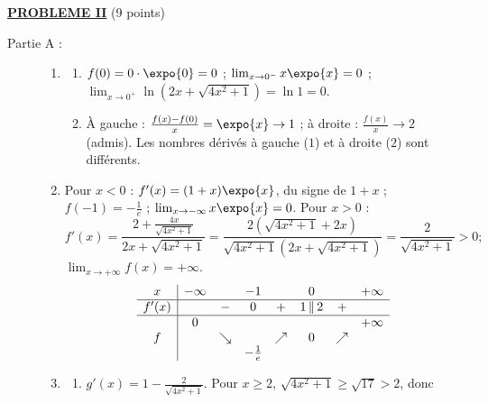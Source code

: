 \noindent \underline{\textsc{\textbf{PROBLEME II}}} (9 points)
\begin{description}
	\item[Partie A :]
	\begin{enumerate}
		\item
		\begin{enumerate}
			\item {}
				$f(0) = 0 \cdot \expo{0} = 0$ ; $\lim_{x\to 0^-} x\expo{x} = 0$ ; $\lim_{x\to 0^+} \ln\left(2x + \sqrt{4x^2+1}\right) = \ln 1 = 0$.
				\par\noindent{}
			\item {}
				À gauche : $\frac{f(x) - f(0)}{x} = \expo{x} \to 1$ ; à droite : $\frac{f(x)}{x} \to 2$ (admis).
				Les nombres dérivés à gauche ($1$) et à droite ($2$) sont différents.
				\par\noindent{}
		\end{enumerate}
		\item {}
			Pour $x < 0$ : $f'(x) = (1 + x)\expo{x}$, du signe de $1 + x$ ; $f(-1) = -\frac{1}{e}$ ; $\lim_{x\to-\infty} x\expo{x} = 0$.
			Pour $x > 0$ :
			\[ f'(x) = \frac{2 + \frac{4x}{\sqrt{4x^2+1}}}{2x + \sqrt{4x^2+1}} = \frac{2\left(\sqrt{4x^2+1} + 2x\right)}{\sqrt{4x^2+1}\left(2x + \sqrt{4x^2+1}\right)} = \frac{2}{\sqrt{4x^2+1}} > 0 ; \]
			$\lim_{x\to+\infty} f(x) = +\infty$.
			\[
			\begin{array}{c|ccccccc}
				x & -\infty & & -1 & & 0 & & +\infty \\ \hline
				f'(x) & & - & 0 & + & 1 \,\|\, 2 & + & \\ \hline
				 & 0 & & & & & & +\infty \\
				f & & \searrow & & \nearrow & 0 & \nearrow & \\
				 & & & -\frac{1}{e} & & & &
			\end{array}
			\]
		\item
		\begin{enumerate}
			\item {}
				$g'(x) = 1 - \frac{2}{\sqrt{4x^2+1}}$. Pour $x \geq 2$, $\sqrt{4x^2 + 1} \geq \sqrt{17} > 2$, donc
				\par\noindent\ansbox{$g'(x) > 0$ sur $[2;+\infty[$.}

\end{enumerate}
\end{enumerate}
\end{description}
